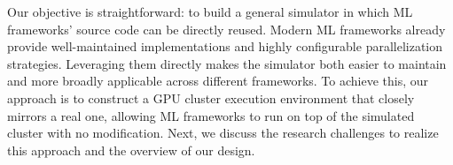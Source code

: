  Our objective is straightforward: to build a general simulator in which ML frameworks’ source code can be directly reused. Modern ML frameworks already provide well-maintained implementations and highly configurable parallelization strategies. Leveraging them directly makes the simulator both easier to maintain and more broadly applicable across different frameworks. To achieve this, our approach is to construct a GPU cluster execution environment that closely mirrors a real one, allowing ML frameworks to run on top of the simulated cluster with no modification. Next, we discuss the research challenges to realize this approach and the overview of our design.
